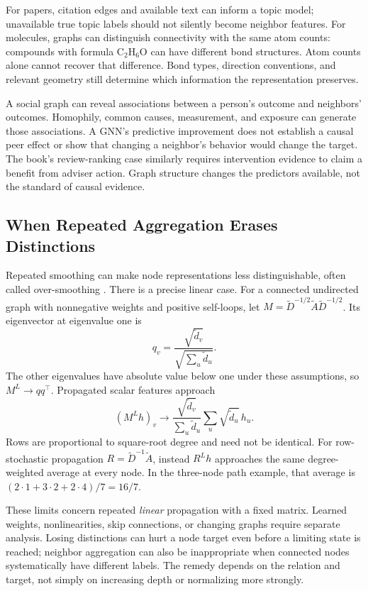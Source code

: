 For papers, citation edges and available text can inform a topic model; unavailable true topic labels should not silently become neighbor features. For molecules, graphs can distinguish connectivity with the same atom counts: compounds with formula $\mathrm{C}_2\mathrm{H}_6\mathrm O$ can have different bond structures. Atom counts alone cannot recover that difference. Bond types, direction conventions, and relevant geometry still determine which information the representation preserves.

A social graph can reveal associations between a person's outcome and neighbors' outcomes. Homophily, common causes, measurement, and exposure can generate those associations. A GNN's predictive improvement does not establish a causal peer effect or show that changing a neighbor's behavior would change the target. The book's review-ranking case similarly requires intervention evidence to claim a benefit from adviser action. Graph structure changes the predictors available, not the standard of causal evidence.

\subsection{When Repeated Aggregation Erases Distinctions}

Repeated smoothing can make node representations less distinguishable, often called over-smoothing \citep{li2018oversmoothing}. There is a precise linear case. For a connected undirected graph with nonnegative weights and positive self-loops, let $M=\widetilde D^{-1/2}\widetilde A\widetilde D^{-1/2}$. Its eigenvector at eigenvalue one is
\[
 q_v=\frac{\sqrt{\widetilde d_v}}{\sqrt{\sum_u\widetilde d_u}}.
\]
The other eigenvalues have absolute value below one under these assumptions, so $M^L\to qq^\top$. Propagated scalar features approach
\[
 (M^Lh)_v\longrightarrow
 \frac{\sqrt{\widetilde d_v}}{\sum_u\widetilde d_u}
 \sum_u\sqrt{\widetilde d_u}\,h_u.
\]
Rows are proportional to square-root degree and need not be identical. For row-stochastic propagation $R=\widetilde D^{-1}\widetilde A$, instead $R^Lh$ approaches the same degree-weighted average at every node. In the three-node path example, that average is $(2\cdot1+3\cdot2+2\cdot4)/7=16/7$.

These limits concern repeated \emph{linear} propagation with a fixed matrix. Learned weights, nonlinearities, skip connections, or changing graphs require separate analysis. Losing distinctions can hurt a node target even before a limiting state is reached; neighbor aggregation can also be inappropriate when connected nodes systematically have different labels. The remedy depends on the relation and target, not simply on increasing depth or normalizing more strongly.

